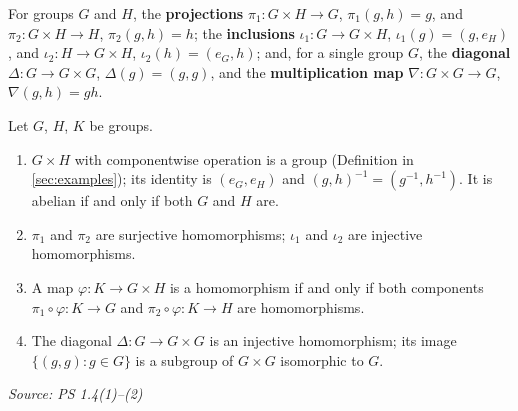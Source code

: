 \documentclass[11pt]{report}
\newcommand{\srcline}[1]{\par\hfill{\footnotesize\textit{Source: #1}}}
\begin{document}
\begin{defbox}\label{def:structure-maps-product}
For groups $G$ and $H$, the \textbf{projections} $\pi_1: G \times H \to G$, $\pi_1(g, h) = g$, and $\pi_2: G \times H \to H$, $\pi_2(g, h) = h$; the \textbf{inclusions} $\iota_1: G \to G \times H$, $\iota_1(g) = (g, e_H)$, and $\iota_2: H \to G \times H$, $\iota_2(h) = (e_G, h)$; and, for a single group $G$, the \textbf{diagonal} $\Delta: G \to G \times G$, $\Delta(g) = (g, g)$, and the \textbf{multiplication map} $\nabla: G \times G \to G$, $\nabla(g, h) = gh$.
\end{defbox}

\begin{propbox}\label{prop:product-universal-property}
Let $G$, $H$, $K$ be groups.
\begin{enumerate}
    \item $G \times H$ with componentwise operation is a group (Definition in \ref{sec:examples}); its identity is $(e_G, e_H)$ and $(g, h)^{-1} = (g^{-1}, h^{-1})$. It is abelian if and only if both $G$ and $H$ are.
    \item $\pi_1$ and $\pi_2$ are surjective homomorphisms; $\iota_1$ and $\iota_2$ are injective homomorphisms.
    \item A map $\varphi: K \to G \times H$ is a homomorphism if and only if both components $\pi_1 \circ \varphi: K \to G$ and $\pi_2 \circ \varphi: K \to H$ are homomorphisms.
    \item The diagonal $\Delta: G \to G \times G$ is an injective homomorphism; its image $\{(g, g) : g \in G\}$ is a subgroup of $G \times G$ isomorphic to $G$.
\end{enumerate}
\srcline{PS 1.4(1)--(2)}
\end{propbox}
\end{document}
